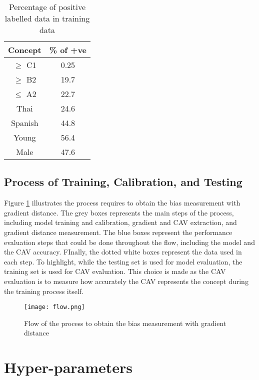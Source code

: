 \begin{table}[H]
    \centering
    \begin{tabular}{|c|c|}
        \hline
        \textbf{Concept} & \textbf{\% of +ve} \\
        \hline
        $\geq$ C1        & 0.25               \\
        $\geq$ B2        & 19.7               \\
        $\leq$ A2        & 22.7               \\ \hline
        Thai             & 24.6               \\
        Spanish          & 44.8               \\ \hline
        Young            & 56.4               \\ \hline
        Male             & 47.6               \\
        \hline
    \end{tabular}
    \caption{Percentage of positive labelled data in training data}
    \label{tab:pos_target}
\end{table}


\subsection{Process of Training, Calibration, and Testing}

Figure \ref{fig:flow} illustrates the process requires to obtain the bias measurement with gradient distance. The grey boxes represents the main steps of the process, including model training and calibration, gradient and CAV extraction, and gradient distance measurement. The blue boxes represent the performance evaluation steps that could be done throughout the flow, including the model and the CAV accuracy. FInally, the dotted white boxes represent the data used in each step. To highlight, while the testing set is used for model evaluation, the training set is used for CAV evaluation. This choice is made as the CAV evaluation is to measure how accurately the CAV represents the concept during the training process itself.

\begin{figure}[H]
    \centering
    \texttt{[image: flow.png]}
    \caption{Flow of the process to obtain the bias measurement with gradient distance}
    \label{fig:flow}
\end{figure}

\section{Hyper-parameters}
